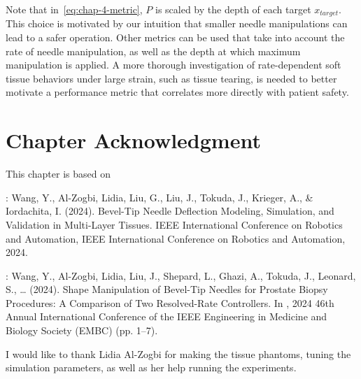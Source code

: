 Note that in~\cref{eq:chap-4-metric}, $P$ is scaled by the depth of each target $x_{target}$. This choice is motivated by our intuition that smaller needle manipulations can lead to a safer operation. Other metrics can be used that take into account the rate of needle manipulation, as well as the depth at which maximum manipulation is applied. A more thorough investigation of rate-dependent soft tissue behaviors under large strain, such as tissue tearing, is needed to better motivate a performance metric that correlates more directly with patient safety. 


\section{Chapter Acknowledgment}
\label{sec:chap-4-ack}
This chapter is based on

\parencite{wangBevelTipNeedleDeflection2024}:  Wang, Y., Al-Zogbi, Lidia, Liu, G., Liu, J., Tokuda, J., Krieger, A., \& Iordachita, I. (2024). Bevel-Tip Needle Deflection Modeling, Simulation, and Validation in Multi-Layer Tissues. IEEE International Conference on Robotics and Automation, IEEE International Conference on Robotics and Automation, 2024.

\parencite{wangShapeManipulationBevelTip2024}: Wang, Y., Al-Zogbi, Lidia, Liu, J., Shepard, L., Ghazi, A., Tokuda, J., Leonard, S., … (2024). Shape Manipulation of Bevel-Tip Needles for Prostate Biopsy Procedures: A Comparison of Two Resolved-Rate Controllers. In , 2024 46th Annual International Conference of the IEEE Engineering in Medicine and Biology Society (EMBC) (pp. 1–7).

I would like to thank Lidia Al-Zogbi for making the tissue phantoms, tuning the simulation parameters, as well as her help running the experiments.

